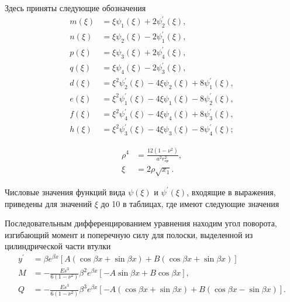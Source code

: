 Здесь приняты следующие обозначения
\begin{equation}
  \label{Timoshenko_eq5}
  \begin{split}
    m(\xi)&=\xi \psi_1(\xi)+2 \psi_2^{\prime}(\xi),\\
    n(\xi)&=\xi \psi_2(\xi)-2 \psi_1^{\prime}(\xi),\\
    p(\xi)&=\xi \psi_3(\xi)+2 \psi_4^{\prime}(\xi),\\
    q(\xi)&=\xi \psi_4(\xi)-2 \psi_3^{\prime}(\xi),\\
    d(\xi)&={\xi}^2 \psi_2^{\prime}(\xi)-4 \xi \psi_2(\xi)+8 \psi_1^{\prime}(\xi),\\
    e(\xi)&={\xi}^2 \psi_1^{\prime}(\xi)-4 \xi \psi_1(\xi)-8 \psi_2^{\prime}(\xi),\\
    f(\xi)&={\xi}^2 \psi_4^{\prime}(\xi)-4 \xi \psi_4(\xi)+8 \psi_3^{\prime}(\xi),\\
    h(\xi)&={\xi}^2 \psi_3^{\prime}(\xi)-4 \xi \psi_3(\xi)-8 \psi_4^{\prime}(\xi);
  \end{split}  
\end{equation}

\begin{equation}
  \label{Timoshenko_eq6}
  \begin{split}
    {\rho}^4&=\frac{12 \left( 1- {\nu}^2 \right)}{a^2 r_{\text{ср}}^2},\\
    \xi&=2 \rho \sqrt{x_1}.
  \end{split}  
\end{equation}

Числовые значения функций вида $\psi (\xi)$ и $\psi^{\prime} (\xi)$, входящие в выражения, приведены для значений $\xi$ до 10 в таблицах, где имеют следующие значения

Последовательным дифференцированием уравнения находим угол поворота, изгибающий момент и поперечную силу для полоски, выделенной из цилиндрической части втулки 
\begin{equation}
  \label{Timoshenko_eq8}
  \begin{split}
    y^{\prime} &=\beta e^{\beta x} \left[ A \left ( \cos{\beta x} + \sin {\beta x} \right )+ B \left ( \cos{\beta x} + \sin {\beta x} \right ) \right]\\
    M &=-\frac{Es^3}{6 \left( 1- {\nu}^2 \right)}{\beta}^2 e^{\beta x} \left[ -A \sin {\beta x}+B \cos{\beta x} \right],\\
    Q &=-\frac{Es^3}{6 \left( 1- {\nu}^2 \right)}{\beta}^3 e^{\beta x} \left[ -A \left (\cos{\beta x}+\sin {\beta x}\right ) +B \left (\cos{\beta x}-\sin {\beta x}\right ) \right].
  \end{split}  
\end{equation}

